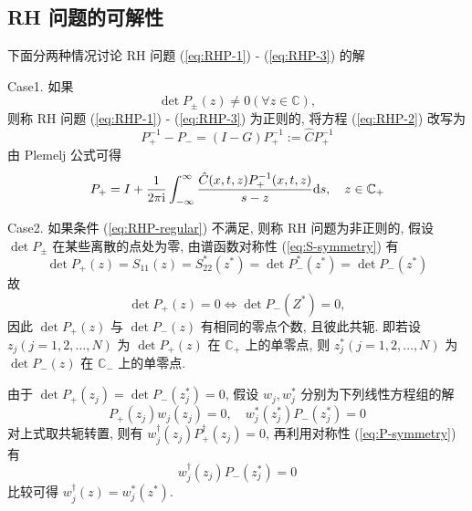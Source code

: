 \subsection{RH 问题的可解性}
下面分两种情况讨论 RH 问题 (\ref{eq:RHP-1}) - (\ref{eq:RHP-3}) 的解

Case1. 如果 
\begin{equation}
  \det P_{\pm} (z) \neq 0 (\forall z \in \mathbb{C}), \label{eq:RHP-regular}
\end{equation} 
则称 RH 问题 (\ref{eq:RHP-1}) - (\ref{eq:RHP-3}) 为正则的, 将方程 (\ref{eq:RHP-2}) 改写为
\begin{equation}
  P^{-1}_{+} - P_{-} = (I - G)P^{-1}_{+} := \hat{C} P^{-1}_{+}
\end{equation}
由 Plemelj 公式可得
\begin{equation}
  P_{+} = I + \frac{1}{2 \pi \mathrm{i}} \int_{-\infty}^{\infty} \frac{\hat{C}(x,t,z) P_{+}^{-1}(x,t,z)}{s - z} \mathrm{d} s, \quad z \in \mathbb{C}_{+}
\end{equation}

Case2. 如果条件 (\ref{eq:RHP-regular}) 不满足, 则称 RH 问题为非正则的, 假设 $ \det P_{\pm} $ 在某些离散的点处为零, 由谱函数对称性 (\ref{eq:S-symmetry}) 有
\begin{equation}
  \det P_{+}(z) = S_{11}(z) = S_{22}^{*}(z^{*}) = \det P_{-}^{*}(z^{*}) = \det P_{-}(z^{*})
\end{equation}
故
\begin{equation}
  \det P_{+}(z) = 0 \iff \det P_{-}(Z^{*}) = 0,
\end{equation}
因此 $ \det P_{+}(z) $ 与 $ \det P_{-}(z) $ 有相同的零点个数, 且彼此共轭. 即若设 $ z_{j} (j = 1,2, \dots , N) $ 为 $ \det P_{+}(z) $ 在 $ \mathbb{C}_{+} $ 上的单零点, 则 $ z^{*}_{j} (j = 1,2, \dots , N) $ 为 $ \det P_{-}(z) $ 在 $ \mathbb{C}_{-} $ 上的单零点. 

由于 $ \det P_{+}(z_{j}) = \det P_{-}(z^{*}_{j}) = 0 $, 假设 $ w_{j}, w_{j}^{*} $ 分别为下列线性方程组的解
\begin{equation}
  P_{+}(z_{j}) w_{j}(z_{j}) = 0, \quad w_{j}^{*}(z_{j}^{*}) P_{-}(z_{j}^{*})  = 0 \label{eq:RHP-singular}
\end{equation}
对上式取共轭转置, 则有 $ w_{j}^{\dagger}(z_{j}) P_{+}^{\dagger}(z_{j})  = 0 $, 再利用对称性 (\ref{eq:P-symmetry}) 有
\begin{equation}
  w_{j}^{\dagger}(z_{j}) P_{-}(z_{j}^{*})  = 0 \label{eq:RHP-singular-Hermitian}
\end{equation}
比较可得 $ w_{j}^{\dagger}(z) = w_{j}^{*}(z^{*}) $.

